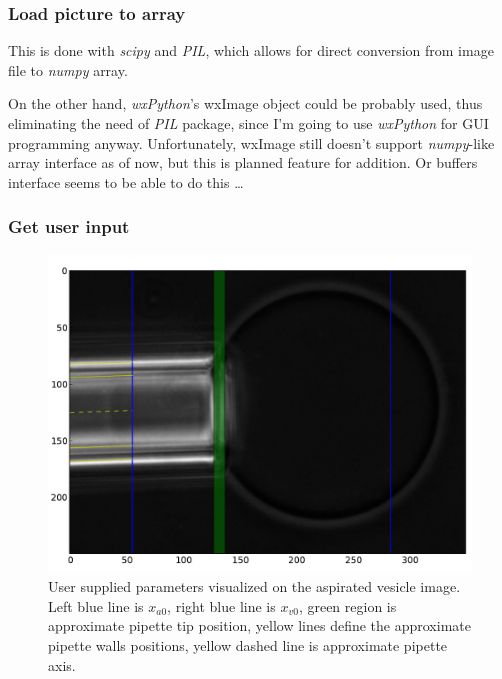 \subsubsection{Load picture to array}\label{loadpic}

This is done with \emph{scipy} and \emph{PIL}, which allows for direct conversion from image file to \emph{numpy} array.

On the other hand, \emph{wxPython}'s wxImage object could be probably used, thus eliminating the need of \emph{PIL} package, since I'm going to use \emph{wxPython} for GUI programming anyway. Unfortunately, wxImage still doesn't support \emph{numpy}-like array interface as of now, but this is planned feature for addition. Or buffers interface seems to be able to do this \ldots

\subsubsection{Get user input}\label{getinput}

\begin{figure}
	\includegraphics[width=\columnwidth]{figs/userinput.pdf}
	\caption{User supplied parameters visualized on the aspirated vesicle image. Left blue line is $x_{a0}$, right blue line is $x_{v0}$, green region is approximate pipette tip position, yellow lines define the approximate pipette walls positions, yellow dashed line is approximate pipette axis.}
	\label{fig:userinput}
\end{figure}

